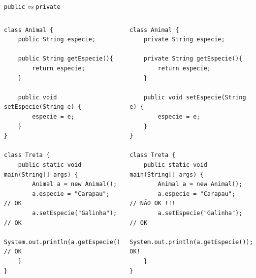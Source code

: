 \documentclass[portuguese, aspectratio=169, xcolor=table]{beamer}
\begin{document}
\begin{frame}[fragile]{\texttt{public} \textit{vs} \texttt{private}}
\begin{columns}
\begin{verbatim}
class Animal {
    public String especie;
    
    public String getEspecie(){
        return especie;
    }

    public void setEspecie(String e) {
        especie = e;
    }
}

class Treta {
    public static void main(String[] args) {
        Animal a = new Animal();
        a.especie = "Carapau";              // OK
        a.setEspecie("Galinha");            // OK
        System.out.println(a.getEspecie()); // OK
    }
}
\end{verbatim}

\begin{verbatim}
class Animal {
    private String especie;
    
    private String getEspecie(){
        return especie;
    }
    
    public void setEspecie(String e) {
        especie = e;
    }
}

class Treta {
    public static void main(String[] args) {
        Animal a = new Animal();
        a.especie = "Carapau";     // NÃO OK !!!
        a.setEspecie("Galinha");   // OK
        System.out.println(a.getEspecie());//NÃO OK!
    }
}
\end{verbatim}
\end{columns}
\end{frame}
\end{document}
